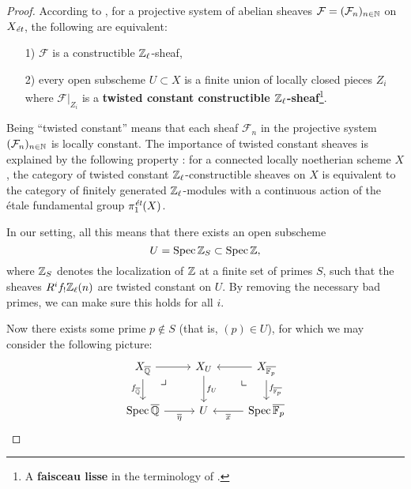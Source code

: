 \documentclass{article}
\numberwithin{equation}{section}
\begin{document}
\begin{proposition}
\begin{proof}
    According to \cite[Exposé~VI, 1.2.6]{SGA5}, for a projective system of
    abelian sheaves $\mathcal{F} = (\mathcal{F}_n)_{n\in\NN}$ on $X_\et$, the
    following are equivalent:
    \begin{enumerate}
    \item[1)] $\mathcal{F}$ is a constructible $\ZZ_\ell$-sheaf,

    \item[2)] every open subscheme $U\subset X$ is a finite union of locally
      closed pieces $Z_i$ where $\left.\mathcal{F}\right|_{Z_i}$ is a
      \textbf{twisted constant constructible $\ZZ_\ell$-sheaf}\footnote{A
        \textbf{faisceau lisse} in the terminology of
        \cite[Rapport]{SGA4-1-2}.}.
    \end{enumerate}

    Being ``twisted constant'' means that each sheaf $\mathcal{F}_n$ in the
    projective system $(\mathcal{F}_n)_{n\in\NN}$ is locally constant. The
    importance of twisted constant sheaves is explained by the following
    property \cite[Exposé~VI, 1.2.4, 1.2.5]{SGA5}: for a connected locally
    noetherian scheme $X$, the category of twisted constant
    $\ZZ_\ell$-constructible sheaves on $X$ is equivalent to the category of
    finitely generated $\ZZ_\ell$-modules with a continuous action of the étale
    fundamental group $\pi_1^\text{\it ét} (X)$.

    In our setting, all this means that there exists an open subscheme
    $$U = \Spec \ZZ_S \subset \Spec \ZZ,$$
    where $\ZZ_S$ denotes the localization of $\ZZ$ at a finite set of primes
    $S$, such that the sheaves $R^i f_! \ZZ_\ell (n)$ are twisted constant on
    $U$. By removing the necessary bad primes, we can make sure this holds
    for all $i$.

    Now there exists some prime $p \notin S$ (that is, $(p) \in U$), for which
    we may consider the following picture:
    \[ \begin{tikzcd}
      X_{\overline{\QQ}} \ar{r}\tikzpb\ar{d}[swap]{f_{\overline{\QQ}}} & X_U \ar{d}{f_U} & X_{\overline{\FF_p}} \ar{l}\ar{d}{f_{\overline{\FF_p}}}\tikzpbur \\
      \Spec \overline{\QQ} \ar{r}[swap]{\overline{\eta}} & U & \Spec \overline{\FF_p} \ar{l}{\overline{x}}
    \end{tikzcd} \]


\end{proof}
\end{proposition}
\end{document}
